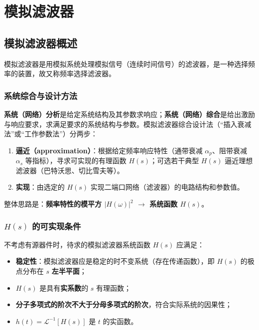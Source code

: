 \section{模拟滤波器}

\subsection{模拟滤波器概述}
模拟滤波器是用模拟系统处理模拟信号（连续时间信号）的滤波器，是一种选择频率的装置，故又称频率选择滤波器。

\subsubsection{系统综合与设计方法}
\textbf{系统（网络）分析}是给定系统结构及其参数求响应；\textbf{系统（网络）综合}是给出激励与响应要求，求满足要求的系统结构与参数。模拟滤波器综合设计法（“插入衰减法”或“工作参数法”）分两步：
\begin{enumerate}
\item \textbf{逼近（approximation）}：根据给定频率响应特性（通带衰减 $\alpha_p$、阻带衰减 $\alpha_s$ 等指标），寻求可实现的有理函数 $H(s)$；可选若干典型 $H(s)$ 逼近理想滤波器（巴特沃思、切比雪夫等）。
\item \textbf{实现}：由选定的 $H(s)$ 实现二端口网络（滤波器）的电路结构和参数值。
\end{enumerate}
整体思路是：\textbf{频率特性的模平方 $|H(\omega)|^2$ $\to$ 系统函数 $H(s)$}。

\subsubsection{$H(s)$ 的可实现条件}
不考虑有源器件时，待求的模拟滤波器系统函数 $H(s)$ 应满足：
\begin{itemize}
\item \textbf{稳定性}：模拟滤波器应是稳定的时不变系统（存在传递函数），即 $H(s)$ 的极点分布在 $s$ \textbf{左半平面}；
\item $H(s)$ 是具有\textbf{实系数}的 $s$ 有理函数；
\item \textbf{分子多项式的阶次不大于分母多项式的阶次}，符合实际系统的因果性；
\item $h(t)=\mathcal{L}^{-1}[H(s)]$ 是 $t$ 的实函数。
\end{itemize}

